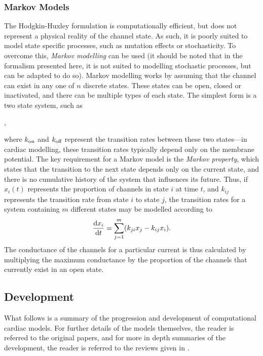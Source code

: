 \documentclass[../thesis-main.tex]{subfiles}
\begin{document}
 \subsubsection{Markov Models}
 \label{subsubsec:markov}
 The Hodgkin-Huxley formulation is computationally efficient, but does not represent a physical reality of the channel state. As such, it is poorly suited to model state specific processes, such as mutation effects or stochasticity. To overcome this, \emph{Markov modelling} can be used (it should be noted that in the formalism presented here, it is not suited to modelling stochastic processes, but can be adapted to do so). Markov modelling works by assuming that the channel can exist in any one of $n$ discrete states. These states can be open, closed or inactivated, and there can be multiple types of each state. The simplest form is a two state system, such as
 \begin{center}
  ,
 \end{center}
 where $k_\textnormal{on}$ and $k_\textnormal{off}$ represent the transition rates between these two states---in cardiac modelling, these transition rates typically depend only on the membrane potential. The key requirement for a Markov model is the \emph{Markov property}, which states that the transition to the next state depends only on the current state, and there is no cumulative history of the system that influences its future. Thus, if $x_i(t)$ represents the proportion of channels in state $i$ at time $t$, and $k_{ij}$ represents the transition rate from state $i$ to state $j$, the transition rates for a system containing $m$ different states may be modelled according to
 \begin{equation}
  \frac{\textnormal{d}x_i}{\textnormal{d}t} = \sum_{j=1}^m (k_{ji}x_j - k_{ij}x_i).
 \end{equation}
 The conductance of the channels for a particular current is thus calculated by multiplying the maximum conductance by the proportion of the channels that currently exist in an open state.
 
 \subsection{Development}
 \label{subsec:model-development}
 What follows is a summary of the progression and development of computational cardiac models. For further details of the models themselves, the reader is referred to the original papers, and for more in depth summaries of the development, the reader is referred to the reviews given in \citet{Noble2001, Noble2012, Noble2011, Puglisi2004, Rudy2006, Niederer2009}.
 
\end{document}
